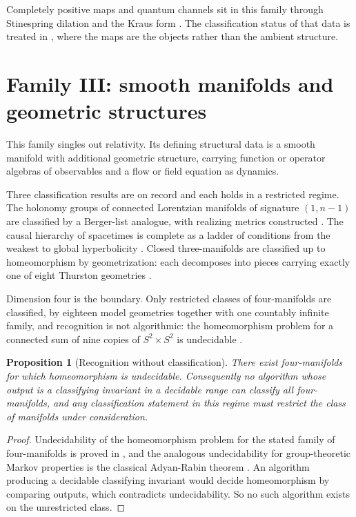 \documentclass[11pt,letterpaper]{article}
\newtheorem{proposition}[theorem]{Proposition}
\theoremstyle{definition}
\theoremstyle{remark}
\begin{document}
Completely positive maps and quantum channels sit in this family through Stinespring dilation and the Kraus form \cite{stinespring,qchannel}. The classification status of that data is treated in , where the maps are the objects rather than the ambient structure.

\section{Family III: smooth manifolds and geometric structures}
\label{sec:family3}

This family singles out relativity. Its defining structural data is a smooth manifold with additional geometric structure, carrying function or operator algebras of observables and a flow or field equation as dynamics.

Three classification results are on record and each holds in a restricted regime. The holonomy groups of connected Lorentzian manifolds of signature $(1, n-1)$ are classified by a Berger-list analogue, with realizing metrics constructed \cite{holonomy}. The causal hierarchy of spacetimes is complete as a ladder of conditions from the weakest to global hyperbolicity \cite{causal}. Closed three-manifolds are classified up to homeomorphism by geometrization: each decomposes into pieces carrying exactly one of eight Thurston geometries \cite{geometrization}.

Dimension four is the boundary. Only restricted classes of four-manifolds are classified, by eighteen model geometries together with one countably infinite family, and recognition is not algorithmic: the homeomorphism problem for a connected sum of nine copies of $S^2 \times S^2$ is undecidable \cite{tancer}.

\begin{proposition}[Recognition without classification]
\label{prop:recognition}
There exist four-manifolds for which homeomorphism is undecidable. Consequently no algorithm whose output is a classifying invariant in a decidable range can classify all four-manifolds, and any classification statement in this regime must restrict the class of manifolds under consideration.
\end{proposition}

\begin{proof}
Undecidability of the homeomorphism problem for the stated family of four-manifolds is proved in \cite{tancer}, and the analogous undecidability for group-theoretic Markov properties is the classical Adyan-Rabin theorem \cite{adyanrabin}. An algorithm producing a decidable classifying invariant would decide homeomorphism by comparing outputs, which contradicts undecidability. So no such algorithm exists on the unrestricted class.
\end{proof}
\end{document}
